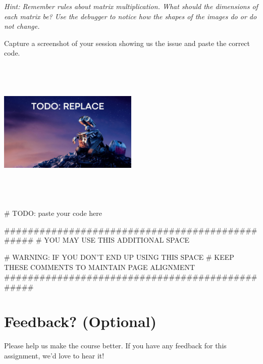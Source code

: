 \documentclass[11pt]{article}
\begin{document}
\emph{Hint: Remember rules about matrix multiplication. What should the dimensions of each matrix be? Use the debugger to notice how the shapes of the images do or do not change.}

Capture a screenshot of your session showing us the issue and paste the correct code.

\begin{tcolorbox}[colback=white!5!white,colframe=green!75!black,breakable,height=15cm,enhanced jigsaw,pad at break*=1mm]
    \includegraphics[width=0.5\textwidth,height=7cm,keepaspectratio]{images/TODO wall-e.jpg}
    
    \begin{python}
    # TODO: paste your code here
    
    
    
    
    
    
    
    
    
    
    
    
    
    
    
    ################################################
    # YOU MAY USE THIS ADDITIONAL SPACE
    
    # WARNING: IF YOU DON'T END UP USING THIS SPACE
    # KEEP THESE COMMENTS TO MAINTAIN PAGE ALIGNMENT
    ################################################
    \end{python}
    
\end{tcolorbox}

\pagebreak
\section*{Feedback? (Optional)}
Please help us make the course better. If you have any feedback for this assignment, we'd love to hear it!
\end{document}
